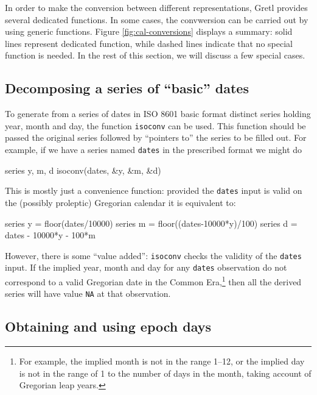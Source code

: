 In order to make the conversion between different representations,
Gretl provides several dedicated functions. In some cases, the
convwersion can be carried out by using generic functions. Figure
\ref{fig:cal-conversions} displays a summary: solid lines represent
dedicated function, while dashed lines indicate that no special
function is needed. In the rest of this section, we will discuss a few
special cases.

\subsection{Decomposing a series of ``basic'' dates}

To generate from a series of dates in ISO 8601 basic format distinct
series holding year, month and day, the function \texttt{isoconv} can
be used. This function should be passed the original series followed
by ``pointers to'' the series to be filled out. For example, if we
have a series named \texttt{dates} in the prescribed format we might
do
%
\begin{code}
series y, m, d
isoconv(dates, &y, &m, &d)
\end{code}

This is mostly just a convenience function: provided the
\texttt{dates} input is valid on the (possibly proleptic) Gregorian
calendar it is equivalent to:
%
\begin{code}
series y = floor(dates/10000)
series m = floor((dates-10000*y)/100)
series d = dates - 10000*y - 100*m
\end{code}

However, there is some ``value added'': \texttt{isoconv} checks the
validity of the \texttt{dates} input. If the implied year, month and
day for any \texttt{dates} observation do not correspond to a valid
Gregorian date in the Common Era,\footnote{For example, the implied
  month is not in the range 1--12, or the implied day is not in the
  range of 1 to the number of days in the month, taking account of
  Gregorian leap years.} then all the derived series will have value
\texttt{NA} at that observation.



\subsection{Obtaining and using epoch days}



